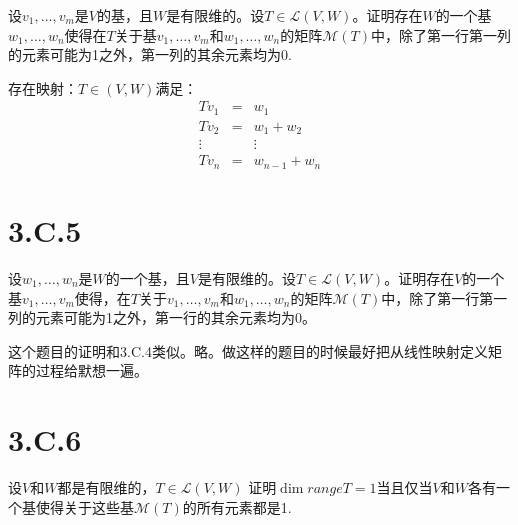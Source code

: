 \documentclass[10pt,a4paper,UTF8]{article}
\begin{document}
\begin{problem}
设\(v_{1},\ldots ,v_{m}\)是\(V\)的基，且\(W\)是有限维的。设\(T\in \mathcal{L}(V,W)\)。证明存在\(W\)的一个基\(w_{1},\ldots ,w_{n}\)使得在\(T\)关于基\(v_{1},\ldots ,v_{m}\)和\(w_{1},\ldots ,w_{n}\)的矩阵\(\mathcal{M}(T)\)中，除了第一行第一列的元素可能为1之外，第一列的其余元素均为0.
\end{problem}

\begin{answer}
存在映射：\(T\in (V,W)\)满足：
\begin{eqnarray*}
Tv_{1}&=&w_{1} \\
Tv_{2}&=&w_{1} + w_{2} \\
\vdots && \vdots \\
Tv_{n} &=& w_{n-1} + w_{n}
\end{eqnarray*}
\end{answer}
\section{3.C.5}
\label{sec:org62e4bad}


\begin{problem}
设\(w_{1},\ldots ,w_{n}\)是\(W\)的一个基，且\(V\)是有限维的。设\(T\in \mathcal{L}(V,W)\)。证明存在\(V\)的一个基\(v_{1},\ldots ,v_{m}\)使得，在\(T\)关于\(v_{1},\ldots ,v_{m}\)和\(w_{1},\ldots ,w_{n}\)的矩阵\(\mathcal{M}(T)\)中，除了第一行第一列的元素可能为1之外，第一行的其余元素均为0。
\end{problem}

\begin{answer}
这个题目的证明和3.C.4类似。略。做这样的题目的时候最好把从线性映射定义矩阵的过程给默想一遍。
\end{answer}

\section{3.C.6}
\label{sec:org621f3b5}


\begin{problem}
设\(V\)和\(W\)都是有限维的，\(T\in \mathcal{L}(V,W)\) 证明\(\dim rangeT = 1\)当且仅当\(V\)和\(W\)各有一个基使得关于这些基\(\mathcal{M}(T)\)的所有元素都是1.
\end{problem}
\end{document}
